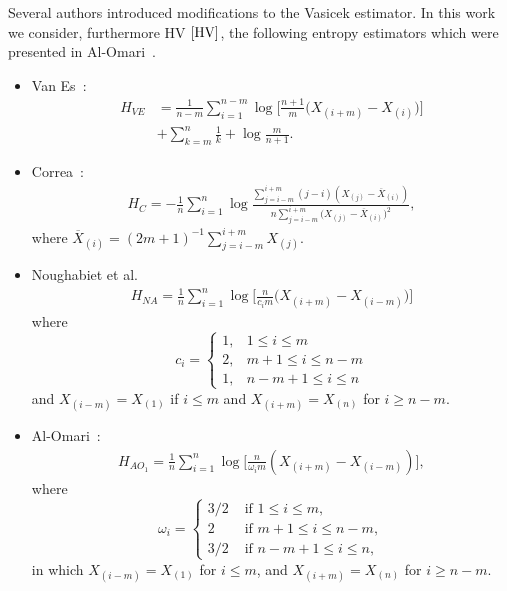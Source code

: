 \documentclass[journal]{IEEEtran}
\begin{document}
	Several authors introduced modifications to the Vasicek estimator. In this work we consider, furthermore HV$~\eqref{HV}$,  the following entropy estimators which were presented in Al-Omari~\cite{AlOmari2016}. 
	\begin{itemize}
		\item Van Es~\cite{VanEs92}:
		\begin{align}
			\label{HVE}
			H_{VE}&=\frac{1}{n-m} \sum_{i=1}^{n-m}\log{\Big[\frac{n+1}{m}\big(X_{(i+m)}-X_{(i)}\big)\Big]} \nonumber\\
			&+\sum_{k=m}^{n} \frac{1}{k}+\log \frac{m}{n+1}.
		\end{align}
		\item Correa~\cite{Correa95}:
		\begin{align}
			\label{HC}
			H_{C}=-\frac{1}{n} \sum_{i=1}^{n} \log \frac{\sum_{j=i-m}^{i+m}(j-i)\left(X_{(j)}-\overline{X}_{(i)}\right)}{n \sum_{j=i-m}^{i+m}\big(X_{(j)}-\overline{X}_{(i)}\big)^{2}},
		\end{align}
		where $\overline{X}_{(i)}=(2 m+1)^{-1} \sum_{j=i-m}^{i+m} X_{(j)}$.
		\item Noughabiet et al.~\cite{Noughabi2010} 
		\label{HNA}
		\begin{align}
        H_{NA}=\frac{1}{n} \sum_{i=1}^{n} \log \Big[\frac{n}{c_{i} m}\big(X_{(i+m)}-X_{(i-m)}\big)\Big]
        \end{align}
        where 
        \begin{equation*}
        c_{i}=\left\{\begin{array}{ll}
        1, & 1 \leq i \leq m \\
        2, & m+1 \leq i \leq n-m \\
        1, & n-m+1 \leq i \leq n
        \end{array}\right.
\end{equation*}
and $X_{(i-m)}=X_{(1)}$ if $i \leq m$ and $X_{(i+m)}=X_{(n)}$ for $i \geq n-m .$ 
		\item Al-Omari~\cite{AlOmari2014}:
		\begin{align}
			H_{{AO}_1}=\frac{1}{n} \sum_{i=1}^{n} \log \Big[\frac{n}{\omega_{i} m}\left(X_{(i+m)}-X_{(i-m)}\right)\Big], 
			\label{AHE}
		\end{align}
		where
		\begin{equation*}
			\omega_{i}= \begin{cases}
				3/2 & \text{ if }1 \leq i \leq m, \\
				2 & \text{ if } m+1 \leq i \leq n-m, \\
				3/2 & \text{ if } n-m+1 \leq i \leq n,
			\end{cases}
		\end{equation*}
		in which $X_{(i-m)}=X_{(1)}$ for $i \leq m$, and $X_{(i+m)}=X_{(n)}$ for $i \geq n-m$. 
		

\end{itemize}
\end{document}
